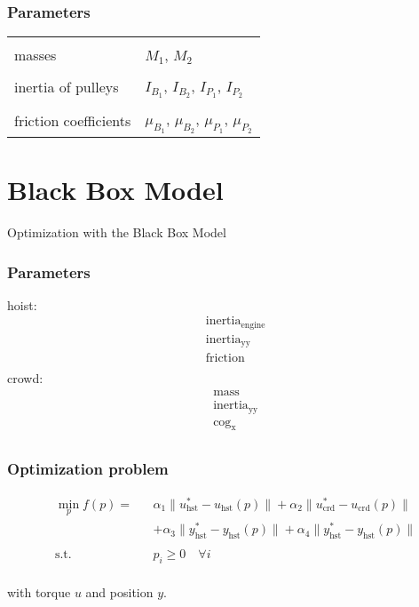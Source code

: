 \documentclass{beamer}
\begin{document}
\begin{frame}
    \frametitle{Parameters}

    \begin{tabular}{ll}
        & \\
        masses & $M_1$, $M_2$ \\
        &\\
        inertia of pulleys & $I_{B_1}$, $I_{B_2}$, $I_{P_1}$, $I_{P_2}$ \\
        &\\
        friction coefficients & $\mu_{B_1}$, $\mu_{B_2}$, $\mu_{P_1}$, 
        $\mu_{P_2}$  \\
    \end{tabular}
\end{frame}


\section{Black Box Model}

\begin{frame}[c]
    \begin{center}
        \large{\textcolor{TUMblau2}{Optimization with the Black Box Model}}
    \end{center}
\end{frame}

\begin{frame}
    \frametitle{Parameters}

    hoist:
    \begin{align*}
        &\text{inertia}_{\text{engine}} \\
        &\text{inertia}_{\text{yy}} \\
        &\text{friction} \\
    \end{align*}
    crowd:
    \begin{align*}
        &\text{mass} \\
        &\text{inertia}_{\text{yy}} \\
        &\text{cog}_{\text{x}} \\
    \end{align*}

\end{frame}

\begin{frame}
    \frametitle{Optimization problem}
    
    \begin{align*}
        &\min\limits_p f(p) =
        & &\alpha_1 \|u_{\text{hst}}^* -u_{\text{hst}}(p) \| 
        + \alpha_2 \|u_{\text{crd}}^* -u_{\text{crd}}(p) \| \\
        &
        & &+ \alpha_3 \|y^*_{\text{hst}} -y_{\text{hst}}(p) \| 
        + \alpha_4 \|y^*_{\text{hst}} -y_{\text{hst}}(p) \| \\
        &\\
        &\text{s.t.}
        & &p_i \geq 0 \quad \forall i \\
    \end{align*}

    with torque $u$ and position $y$.
\end{frame}
\end{document}
